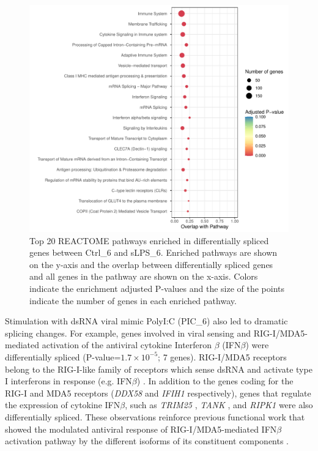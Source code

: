 \begin{figure}[H]
  \centering
  \includegraphics[width=\textwidth]{ds_sLPS_6_vs_Ctrl_6}
  \caption[REACTOME pathways enriched in differentially spliced genes (sLPS\_6 versus Ctrl\_6)]{Top 20 REACTOME pathways enriched in differentially spliced genes between Ctrl\_6 and sLPS\_6. Enriched pathways are shown on the y-axis and the overlap between differentially spliced genes and all genes in the pathway are shown on the x-axis. Colors indicate the enrichment adjusted P-values and the size of the points indicate the number of genes in each enriched pathway.}
  \label{fig:ds_sLPS_6_vs_Ctrl_6}   
\end{figure}

Stimulation with dsRNA viral mimic PolyI:C (PIC\_6) also led to dramatic splicing changes. For example, genes involved in viral sensing and RIG-I/MDA5-mediated activation of the antiviral cytokine Interferon $\beta$ (IFN$\beta$) were differentially spliced (P-value=$1.7\times10^{-5}$; 7 genes). RIG-I/MDA5 receptors belong to the RIG-I-like family of receptors which sense dsRNA and activate type I interferons in response (e.g. IFN$\beta$) \cite{Yoneyama2005-ba,Kato2005-ie}. In addition to the genes coding for the RIG-I and MDA5 receptors (\textit{DDX58} and \textit{IFIH1} respectively), genes that regulate the expression of cytokine IFN$\beta$, such as \textit{TRIM25} \cite{Castanier2012-io}, \textit{TANK} \cite{Al_Hamrashdi2022-pr}, and \textit{RIPK1} \cite{Saleh2017-fv} were also differentially spliced. These observations reinforce previous functional work that showed the modulated antiviral response of RIG-I/MDA5-mediated IFN$\beta$ activation pathway by the different isoforms of its constituent components \cite{Gack2009-nw,Liao2021-aj,Lad2008-jd}. \\



